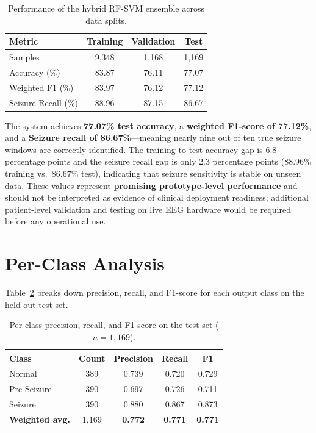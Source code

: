 \documentclass[12pt, a4paper]{report}
\begin{document}
\begin{table}[H]
  \centering
  \caption{Performance of the hybrid RF-SVM ensemble across data splits.}
  \label{tab:overall_perf}
  \begin{tabular}{lccc}
    \toprule
    \textbf{Metric} & \textbf{Training} & \textbf{Validation} & \textbf{Test} \\
    \midrule
    Samples              & 9,348   & 1,168   & 1,169   \\
    Accuracy (\%)        & 83.87   & 76.11   & 77.07   \\
    Weighted F1 (\%)     & 83.97   & 76.12   & 77.12   \\
    Seizure Recall (\%)  & 88.96   & 87.15   & 86.67   \\
    \bottomrule
  \end{tabular}
\end{table}

The system achieves \textbf{77.07\% test accuracy}, a \textbf{weighted
F1-score of 77.12\%}, and a \textbf{Seizure recall of 86.67\%}---meaning
nearly nine out of ten true seizure windows are correctly identified. The
training-to-test accuracy gap is 6.8 percentage points and the seizure
recall gap is only 2.3 percentage points (88.96\% training vs.\ 86.67\%
test), indicating that seizure sensitivity is stable on unseen data. These
values represent \textbf{promising prototype-level performance} and should
not be interpreted as evidence of clinical deployment readiness; additional
patient-level validation and testing on live EEG hardware would be required
before any operational use.

\section{Per-Class Analysis}
\label{sec:perclass}

Table~\ref{tab:perclass} breaks down precision, recall, and F1-score for
each output class on the held-out test set.

\begin{table}[H]
  \centering
  \caption{Per-class precision, recall, and F1-score on the test set ($n=1{,}169$).}
  \label{tab:perclass}
  \begin{tabular}{lcccc}
    \toprule
    \textbf{Class} & \textbf{Count} & \textbf{Precision} & \textbf{Recall} & \textbf{F1} \\
    \midrule
    Normal      & 389 & 0.739 & 0.720 & 0.729 \\
    Pre-Seizure & 390 & 0.697 & 0.726 & 0.711 \\
    Seizure     & 390 & 0.880 & 0.867 & 0.873 \\
    \midrule
    \textbf{Weighted avg.} & 1{,}169 & \textbf{0.772} & \textbf{0.771} & \textbf{0.771} \\
    \bottomrule
  \end{tabular}
\end{table}
\end{document}
